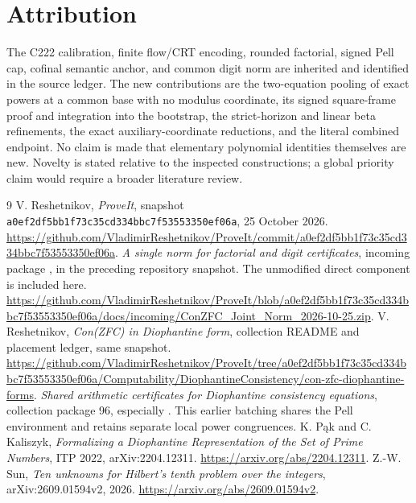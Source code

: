 \documentclass[11pt,letterpaper]{article}
\theoremstyle{definition}\newtheorem{definition}[theorem]{Definition}
\theoremstyle{remark}\newtheorem{remark}[theorem]{Remark}
\begin{document}
\section*{Attribution}
The C222 calibration, finite flow/CRT encoding, rounded factorial, signed
Pell cap, cofinal semantic anchor, and common digit norm are inherited
and identified in the source ledger. The new contributions are the
two-equation pooling of exact powers at a common base with no modulus
coordinate, its signed square-frame proof and integration into the
bootstrap, the strict-horizon and linear beta refinements, the exact
auxiliary-coordinate reductions, and the literal combined endpoint.
No claim is made that elementary polynomial identities themselves are
new. Novelty is stated relative to the inspected constructions; a global
priority claim would require a broader literature review.

\begin{thebibliography}{9}
\small\setlength{\itemsep}{2pt}
 V. Reshetnikov, \emph{ProveIt}, snapshot
\texttt{a0ef2df5bb1f73c35cd334bbc7f53553350ef06a}, 25 October 2026.
\url{https://github.com/VladimirReshetnikov/ProveIt/commit/a0ef2df5bb1f73c35cd334bbc7f53553350ef06a}.
 \emph{A single norm for factorial and digit certificates},
incoming package , in the preceding
repository snapshot. The unmodified direct component is included here.
\url{https://github.com/VladimirReshetnikov/ProveIt/blob/a0ef2df5bb1f73c35cd334bbc7f53553350ef06a/docs/incoming/ConZFC_Joint_Norm_2026-10-25.zip}.
 V. Reshetnikov, \emph{Con(ZFC) in Diophantine form},
collection README and placement ledger, same snapshot.
\url{https://github.com/VladimirReshetnikov/ProveIt/tree/a0ef2df5bb1f73c35cd334bbc7f53553350ef06a/Computability/DiophantineConsistency/con-zfc-diophantine-forms}.
 \emph{Shared arithmetic certificates for Diophantine
consistency equations}, collection package 96, especially
. This earlier batching shares the Pell
environment and retains separate local power congruences.
 K. P\k{a}k and C. Kaliszyk, \emph{Formalizing a Diophantine
Representation of the Set of Prime Numbers}, ITP 2022,
arXiv:2204.12311. \url{https://arxiv.org/abs/2204.12311}.
 Z.-W. Sun, \emph{Ten unknowns for Hilbert's tenth problem
over the integers}, arXiv:2609.01594v2, 2026.
\url{https://arxiv.org/abs/2609.01594v2}.
\end{thebibliography}
\end{document}
